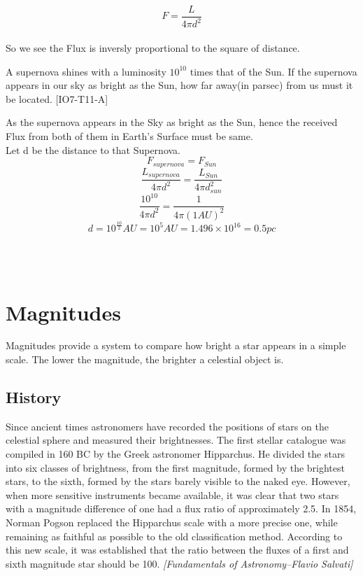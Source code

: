 \documentclass{article}
\begin{document}
$$\boxed{F=\frac{L}{4\pi d^{2}}}$$ 
\\
So we see the Flux is inversly proportional to the square of distance.
\\[2EM]
\begin{tcolorbox}[colback=blue!5!white,
                  colframe=blue!75!black,
                  title=Problem 2]
A supernova shines with a luminosity $10^{10}$ times that of the Sun. If the supernova appears in our sky as bright as the Sun, how far away(in parsec) from us must it be located. 
[IO7-T11-A]
\end{tcolorbox}
\newpage
\noindent
\begin{tcolorbox}[colback=blue!5!white,
                  colframe=blue!75!black,
                  title=Solution]
As the supernova appears in the Sky as bright as the Sun, hence the received Flux from both of them in Earth's Surface must be same. 
\\
Let d be the distance to that Supernova.
\\
$$F_{supernova}=F_{Sun}$$
$$\frac{L_{supernova}}{4\pi d^{2}}=\frac{L_{Sun}}{4\pi d_{sun}^2}$$
$$\frac{10^{10}}{4\pi d^2}=\frac{1}{4\pi (1AU)^2}$$
$$d=10^{\frac{10}{2}}AU=10^5 AU = 1.496 \times 10^{16}=0.5 pc$$
\\[3EM]
\end{tcolorbox}

\\
\section{Magnitudes}
Magnitudes provide a system to compare how bright a star appears in a simple scale. The lower the magnitude, the brighter a celestial object is.
\subsection{History}
Since ancient times astronomers have recorded the positions of stars on the
celestial sphere and measured their brightnesses. The first stellar catalogue
was compiled in 160 BC by the Greek astronomer Hipparchus. He divided
the stars into six classes of brightness, from the first magnitude, formed by the
brightest stars, to the sixth, formed by the stars barely visible to the naked eye.
However, when more sensitive instruments became available, it was clear that
two stars with a magnitude difference of one had a flux ratio of approximately
2.5. In 1854, Norman Pogson replaced the Hipparchus scale with a more precise
one, while remaining as faithful as possible to the old classification method.
According to this new scale, it was established that the ratio between the fluxes
of a first and sixth magnitude star should be 100.
\textit{[Fundamentals of Astronomy–Flavio Salvati]}
\end{document}
